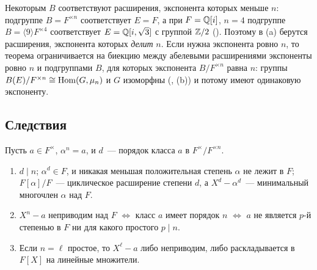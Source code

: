 \begin{remark}
Некоторым $B$ соответствуют расширения, экспонента которых меньше $n$: подгруппе $B=F^{\times n}$ соответствует $E=F$, а
при $F=\mathbb Q[i]$, $n=4$ подгруппе $B=\langle9\rangle F^{\times4}$ соответствует $E=\mathbb Q[i,\sqrt3]$ с группой $\mathbb Z/2$
(). Поэтому в (a) берутся расширения, экспонента которых \emph{делит} $n$. Если нужна экспонента ровно $n$, то
теорема ограничивается на биекцию между абелевыми расширениями экспоненты ровно $n$ и подгруппами $B$, для которых
экспонента $B/F^{\times n}$ равна $n$: группы $B(E)/F^{\times n}\cong\operatorname{Hom}(G,\mu_n)$ и $G$ изоморфны (, (b)) и
потому имеют одинаковую экспоненту.
\end{remark}

\subsection*{Следствия}

\begin{corollary}
Пусть $a\in F^\times$, $\alpha^n=a$, и $d$~--- порядок класса $a$ в $F^\times/F^{\times n}$.
\begin{enumerate}[label=\textup{(\alph*)}]
\item $d\mid n$; $\alpha^d\in F$, и никакая меньшая положительная степень $\alpha$ не лежит в $F$; $F[\alpha]/F$~---
циклическое расширение степени $d$, а $X^d-\alpha^d$~--- минимальный многочлен $\alpha$ над $F$.
\item $X^n-a$ неприводим над $F$ $\iff$ класс $a$ имеет порядок $n$ $\iff$ $a$ не является $p$-й степенью в $F$ ни для
какого простого $p\mid n$.
\item Если $n=\ell$ простое, то $X^\ell-a$ либо неприводим, либо раскладывается в $F[X]$ на линейные множители.
\end{enumerate}
\end{corollary}

